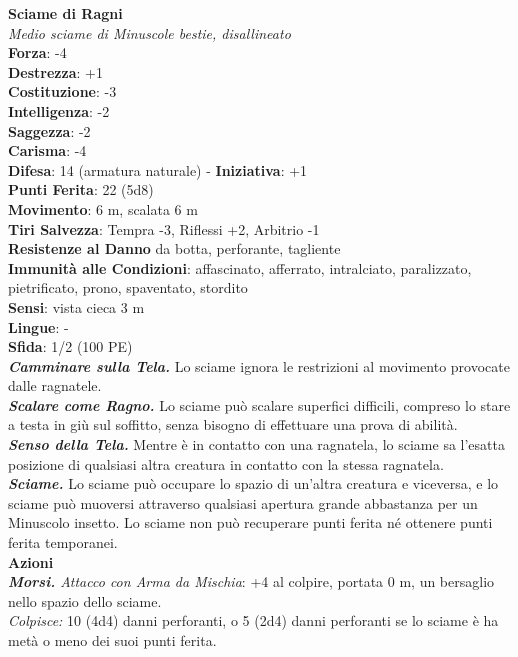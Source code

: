 \begin{multicols}{2}
\medskip\textbf{Sciame di Ragni}\\
\emph{Medio sciame di Minuscole bestie, disallineato}\\
\textbf{Forza}: -4\\
\textbf{Destrezza}: +1\\
\textbf{Costituzione}: -3\\
\textbf{Intelligenza}: -2\\
\textbf{Saggezza}: -2\\
\textbf{Carisma}: -4\\
\textbf{Difesa}: 14 (armatura naturale) - \textbf{Iniziativa}: +1\\
\textbf{Punti Ferita}: 22 (5d8)\\
\textbf{Movimento}: 6 m, scalata 6 m\\
\textbf{Tiri Salvezza}: Tempra -3, Riflessi +2, Arbitrio -1\\
\textbf{Resistenze al Danno} da botta, perforante, tagliente\\
\textbf{Immunità alle Condizioni}: affascinato, afferrato, intralciato, paralizzato, pietrificato, prono, spaventato, stordito\\
\textbf{Sensi}: vista cieca 3 m\\
\textbf{Lingue}: -\\
\textbf{Sfida}: 1/2 (100 PE)\smallskip\\
\emph{\textbf{Camminare sulla Tela.}} Lo sciame ignora le restrizioni al movimento provocate dalle ragnatele.\\
\emph{\textbf{Scalare come Ragno.}} Lo sciame può scalare superfici difficili, compreso lo stare a testa in giù sul soffitto, senza bisogno di effettuare una prova di abilità.\\
\emph{\textbf{Senso della Tela.}} Mentre è in contatto con una ragnatela, lo sciame sa l'esatta posizione di qualsiasi altra creatura in contatto con la stessa ragnatela.\\
\emph{\textbf{Sciame.}} Lo sciame può occupare lo spazio di un'altra creatura e viceversa, e lo sciame può muoversi attraverso qualsiasi apertura grande abbastanza per un Minuscolo insetto. Lo sciame non può recuperare punti ferita né ottenere punti ferita temporanei.\\
\smallskip\textbf{Azioni}\\
\emph{\textbf{Morsi.} Attacco con Arma da Mischia}: +4 al colpire, portata 0 m, un bersaglio nello spazio dello sciame.\\
\emph{Colpisce:} 10 (4d4) danni perforanti, o 5 (2d4) danni perforanti se lo sciame è ha metà o meno dei suoi punti ferita.\\


\end{multicols}
